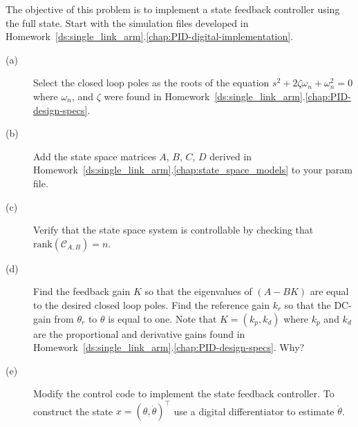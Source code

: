 
The objective of this problem is to implement a state feedback controller using the full state.
Start with the simulation files developed in Homework~\ref{ds:single_link_arm}.\ref{chap:PID-digital-implementation}.
\begin{description}
\item[(a)] Select the closed loop poles as the roots of the equation $s^2 + 2\zeta\omega_n + \omega_n^2 = 0$ where $\omega_n$, and $\zeta$ were found in Homework~\ref{ds:single_link_arm}.\ref{chap:PID-design-specs}.  
\item[(b)] Add the state space matrices $A$, $B$, $C$, $D$ derived in Homework~\ref{ds:single_link_arm}.\ref{chap:state_space_models} to your param file.
\item[(c)] Verify that the state space system is controllable by checking that $\text{rank}(\mathcal{C}_{A,B})=n$.
\item[(d)] Find the feedback gain $K$ so that the eigenvalues of $(A-BK)$ are equal to the desired closed loop poles.  Find the reference gain $k_r$ so that the DC-gain from $\theta_r$ to $\theta$ is equal to one.  Note that $K=(k_p, k_d)$ where $k_p$ and $k_d$ are the proportional and derivative gains found in Homework~\ref{ds:single_link_arm}.\ref{chap:PID-design-specs}.  Why?
\item[(e)] Modify the control code to implement the state feedback controller.  To construct the state $x=(\theta, \dot{\theta})^{\top}$ use a digital differentiator to estimate $\dot{\theta}$.
\end{description}